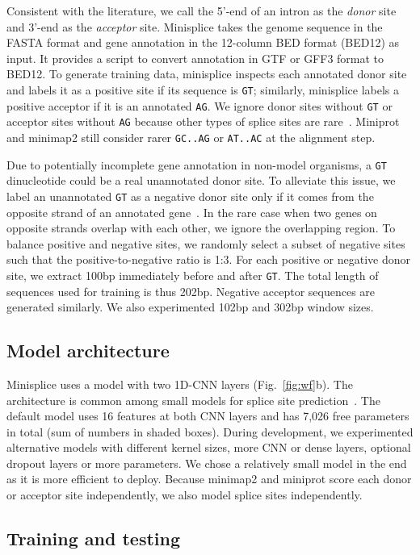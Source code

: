 \documentclass[webpdf,contemporary,large,namedate]{oup-authoring-template}%
\begin{document}
Consistent with the literature, we call the 5'-end of an intron as the \emph{donor} site
and 3'-end as the \emph{acceptor} site.
Minisplice takes the genome sequence in the FASTA format
and gene annotation in the 12-column BED format (BED12) as input.
It provides a script to convert annotation in GTF or GFF3 format to BED12.
To generate training data, minisplice inspects each annotated donor site and labels it as a positive site if its sequence is {\tt GT};
similarly, minisplice labels a positive acceptor if it is an annotated {\tt AG}.
We ignore donor sites without {\tt GT} or acceptor sites without {\tt AG}
because other types of splice sites are rare~\citep{Sibley:2016vh}.
Miniprot and minimap2 still consider rarer {\tt GC..AG} or {\tt AT..AC} at the alignment step.

Due to potentially incomplete gene annotation in non-model organisms,
a {\tt GT} dinucleotide could be a real unannotated donor site.
To alleviate this issue, we label an unannotated {\tt GT} as a negative donor site
only if it comes from the opposite strand of an annotated gene~\citep{Chao:2024aa}.
In the rare case when two genes on opposite strands overlap with each other,
we ignore the overlapping region.
To balance positive and negative sites,
we randomly select a subset of negative sites such that the positive-to-negative ratio is 1:3.
For each positive or negative donor site,
we extract 100bp immediately before and after {\tt GT}.
The total length of sequences used for training is thus 202bp.
Negative acceptor sequences are generated similarly.
We also experimented 102bp and 302bp window sizes.

\subsection{Model architecture}

Minisplice uses a model with two 1D-CNN layers (Fig.~\ref{fig:wf}b).
The architecture is common among small models for splice site prediction~\citep{Zabardast:2023aa}.
The default model uses 16 features at both CNN layers and has 7,026 free parameters in total (sum of numbers in shaded boxes).
During development, we experimented alternative models
with different kernel sizes, more CNN or dense layers, optional dropout layers or more parameters.
We chose a relatively small model in the end as it is more efficient to deploy.
Because minimap2 and miniprot score each donor or acceptor site independently,
we also model splice sites independently.

\subsection{Training and testing}
\end{document}
